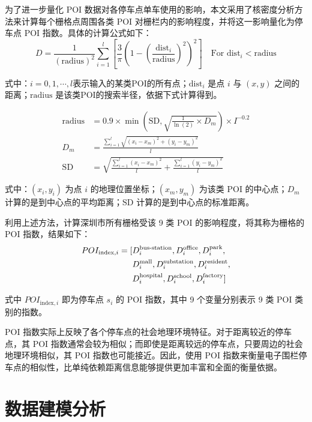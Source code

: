 \documentclass[12pt,a4paper,oneside]{ctexart}
\begin{document}
为了进一步量化 POI 数据对各停车点单车使用的影响，本文采用了核密度分析方法来计算每个栅格点周围各类 POI 对栅栏内的影响程度，并将这一影响量化为停车点 POI 指数。具体的计算公式如下：
\begin{equation}
D = \frac{1}{(\text{radius})^2} \sum_{i=1}^{l} \left[ \frac{3}{\pi} \left( 1 - \left( \frac{\text{dist}_i}{\text{radius}} \right)^2 \right)^2 \right] \quad \text{For } \text{dist}_i < \text{radius}    
\end{equation}


式中：$ i = 0, 1, \cdots, l $表示输入的某类POI的所有点；$\text{dist}_i$ 是点 $ i $ 与 $(x, y)$ 之间的距离；$\text{radius}$ 是该类POI的搜索半径，依据下式计算得到。

\begin{align}
\text{radius} &= 0.9 \times \min\left(\text{SD}, \sqrt{\frac{1}{\ln(2)} \times D_m}\right) \times I^{-0.2} \\
D_m &= \frac{\sum_{i=1}^{l} \sqrt{(x_i - x_m)^2 + (y_i - y_m)^2}}{l}\\
\text{SD} &= \sqrt{\frac{\sum_{i=1}^{l} (x_i - x_m)^2}{l} + \frac{\sum_{i=1}^{l} (y_i - y_m)^2}{l}}
\end{align} 

式中：$(x_i, y_i)$ 为点 $i$ 的地理位置坐标；$(x_m, y_m)$ 为该类 POI 的中心点；$D_m$ 计算的是到中心点的平均距离；$\text{SD}$ 计算的是到中心点的标准距离。

利用上述方法，计算深圳市所有栅格受该 9 类 POI 的影响程度，将其称为栅格的 POI 指数，结果如下：
\begin{align}
POI_{\text{index}, i} = [ & D_i^{\text{bus-station}}, D_i^{\text{office}}, D_i^{\text{park}}, \notag\\
& D_i^{\text{mall}}, D_i^{\text{substation}}, 
D_i^{\text{resident}}, \notag\\
& D_i^{\text{hospital}}, D_i^{\text{school}}, D_i^{\text{factory}} ]
\end{align}

式中 $POI_{\text{index}, i}$ 即为停车点 $s_i$ 的 POI 指数，其中 9 个变量分别表示 9 类 POI 类别的指数。

POI 指数实际上反映了各个停车点的社会地理环境特征。对于距离较近的停车点，其 POI 指数通常会较为相似；而即使是距离较远的停车点，只要周边的社会地理环境相似，其 POI 指数也可能接近。因此，使用 POI 指数来衡量电子围栏停车点的相似性，比单纯依赖距离信息能够提供更加丰富和全面的衡量依据。


\section{数据建模分析}
\end{document}
